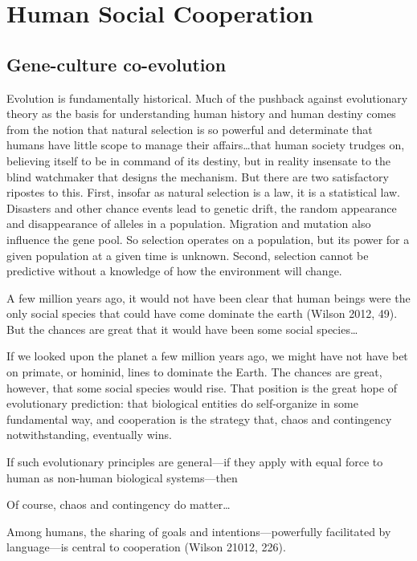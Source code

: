 \documentclass{tufte-book} %
\begin{document}

\chapter{Human Social Cooperation}\label{ch:social-coop}

\section{Gene-culture co-evolution}

Evolution is fundamentally historical. Much of the pushback against evolutionary theory as the basis for understanding human history and human destiny comes from the notion that natural selection is so powerful and determinate that humans have little scope to manage their affairs…that human society trudges on, believing itself to be in command of its destiny, but in reality insensate to the blind watchmaker that designs the mechanism. 
But there are two satisfactory ripostes to this. First, insofar as natural selection is a law, it is a statistical law.  Disasters and other chance events lead to genetic drift, the random appearance and disappearance of alleles in a population. Migration and mutation also influence the gene pool. So selection operates on a population, but its power for a given population at a given time is unknown. Second, selection cannot be predictive without a knowledge of how the environment will change. 


A few million years ago, it would not have been clear that human beings were the only social species that could have come dominate the earth (Wilson 2012, 49). But the chances are great that it would have been some social species…


If we looked upon the planet a few million years ago, we might have not have bet on primate, or hominid, lines to dominate the Earth. The chances are great, however, that some social species would rise. That position is the great hope of evolutionary prediction: that biological entities do self-organize in some fundamental way, and cooperation is the strategy that, chaos and contingency notwithstanding, eventually wins. 

If such evolutionary principles are general—if they apply with equal force to human as non-human biological systems—then 

Of course, chaos and contingency do matter… 

Among humans, the sharing of goals and intentions—powerfully facilitated by language—is central to cooperation (Wilson 21012, 226). 
\end{document}
